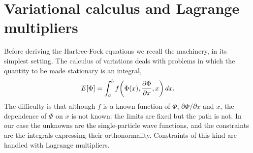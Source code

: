 \section{Variational calculus and Lagrange multipliers}
\label{sec:varcalculus}

Before deriving the Hartree-Fock equations we recall the machinery, in its
simplest setting.  The calculus of variations deals with problems in which the
quantity to be made stationary is an integral,
\begin{equation}
  E[\Phi] = \int_a^b f\!\left(\Phi(x),
    \frac{\partial\Phi}{\partial x}, x\right)dx .
  \label{eq:6-functional}
\end{equation}
The difficulty is that although $f$ is a known function of $\Phi$,
$\partial\Phi/\partial x$ and $x$, the dependence of $\Phi$ on $x$ is not
known: the limits are fixed but the path is not.  In our case the unknowns are
the single-particle wave functions, and the constraints are the integrals
expressing their orthonormality.  Constraints of this kind are handled with
Lagrange multipliers.

